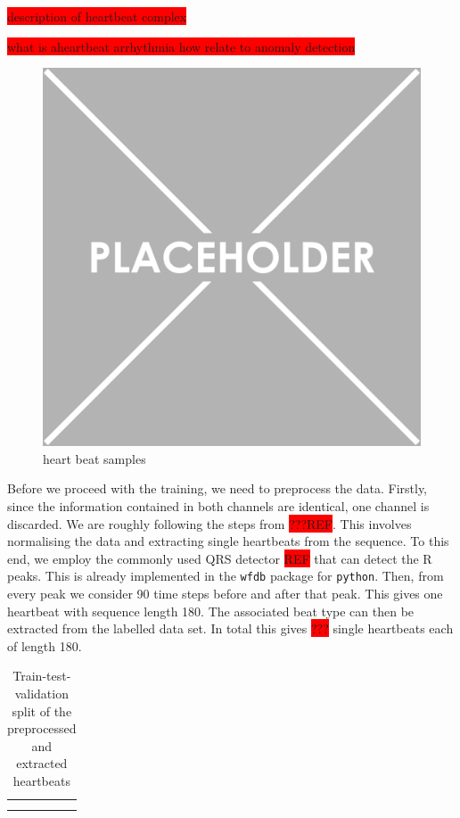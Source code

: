 \colorbox{red}{description of heartbeat complex}

\colorbox{red}{what is aheartbeat arrhythmia how relate to anomaly detection}

\begin{figure}[h]
    \centering
    \includegraphics[scale=0.5]{../images/placeholder.png}
    \caption{heart beat samples}
\end{figure}

Before we proceed with the training, we need to preprocess the data. Firstly, since the information contained in both channels are identical, one channel is discarded. We are roughly following the steps from \colorbox{red}{???REF}. This involves normalising the data and extracting single heartbeats from the sequence. To this end, we employ the commonly used QRS detector \colorbox{red}{REF} that can detect the R peaks. This is already implemented in the \texttt{wfdb} package for \texttt{python}. Then, from every peak we consider 90 time steps before and after that peak. This gives one heartbeat with sequence length 180. The associated beat type can then be extracted from the labelled data set. In total this gives \colorbox{red}{???} single heartbeats each of length 180. 

\begin{table}[h]
    \centering
    \begin{tabular}{c|c}
        & \\ 
        &
    \end{tabular}
    \caption{Train-test-validation split of the preprocessed and extracted heartbeats}
    \label{tab:train-test-val}
\end{table}

